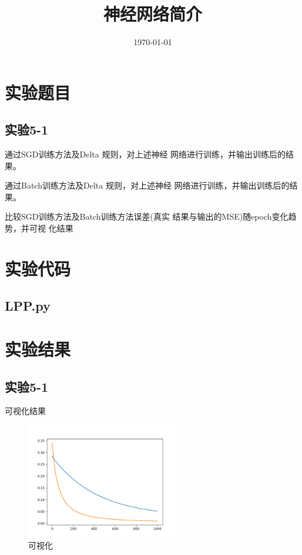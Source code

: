 \documentclass{../source/Experiment}
\title{神经网络简介}
\date{\today}
\begin{document}
    \makecover
    \section{实验题目}
        \subsection{实验5-1}
        通过SGD训练方法及Delta 规则，对上述神经
        网络进行训练，并输出训练后的结果。
        
        通过Batch训练方法及Delta 规则，对上述神经
        网络进行训练，并输出训练后的结果。
        
        比较SGD训练方法及Batch训练方法误差(真实
        结果与输出的MSE)随epoch变化趋势，并可视
        化结果

    \section{实验代码}
    \subsection{LPP.py}
    
   

    \section{实验结果}
        \subsection{实验5-1}
            可视化结果
            \begin{figure}[H]
                \centering
                \includegraphics[width = 0.6\textwidth]{Part5/5-1.png}
                \caption{可视化}
            \end{figure}
\end{document}
